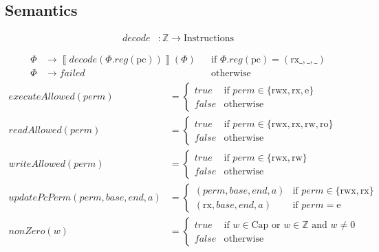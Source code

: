 \documentclass{article}
\newcommand{\sem}[1]{\left\llbracket #1 \right\rrbracket}
\newcommand{\false}{\mathit{false}}
\newcommand{\true}{\mathit{true}}
\newcommand{\var}[1]{\mathit{#1}}
\newcommand{\pcreg}{\mathrm{pc}}
\newcommand{\addr}{\var{a}}
\newcommand{\start}{\var{base}}
\newcommand{\addrend}{\var{end}}
\newcommand{\reg}{\var{reg}}
\newcommand{\perm}{\var{perm}}
\newcommand{\failed}{\mathit{failed}}
\newcommand{\plainfun}[1]{\mathit{#1}}
\newcommand{\decode}{\plainfun{decode}}
\newcommand{\updatePcPerm}[1]{\plainfun{updatePcPerm}(#1)}
\newcommand{\executeAllowed}[1]{\plainfun{executeAllowed}(#1)}
\newcommand{\nonZero}[1]{\plainfun{nonZero}(#1)}
\newcommand{\readAllowed}[1]{\plainfun{readAllowed}(#1)}
\newcommand{\writeAllowed}[1]{\plainfun{writeAllowed}(#1)}
\newcommand{\plaindom}[1]{\mathrm{#1}}
\newcommand{\Caps}{\plaindom{Cap}}
\newcommand{\Instrs}{\plaindom{Instructions}}
\newcommand{\ints}{\mathbb{Z}}
\newcommand{\plainperm}[1]{\mathrm{#1}}
\newcommand{\readonly}{\plainperm{ro}}
\newcommand{\readwrite}{\plainperm{rw}}
\newcommand{\exec}{\plainperm{rx}}
\newcommand{\entry}{\plainperm{e}}
\newcommand{\rwx}{\plainperm{rwx}}
\begin{document}
\subsection*{Semantics}
\begin{align*}
\decode &:\ints \rightarrow \Instrs
\end{align*}

\begin{align*}
\Phi & \rightarrow \sem{\decode(\Phi.\reg(\pcreg))}(\Phi) & & \text{if $\Phi.\reg(\pcreg) = (\exec{\_},{\_},{\_})$} \\
\Phi & \rightarrow \failed                                      & & \text{otherwise}
\end{align*}
\begin{align*}
  \executeAllowed{\perm} &=
                           \begin{cases}
                             \true & \text{if } \perm \in \{ \rwx, \exec, \entry \} \\
                             \false & \text{otherwise}
                           \end{cases} \\
  \readAllowed{\perm} &=
                           \begin{cases}
                             \true & \text{if } \perm \in \{ \rwx, \exec, \readwrite, \readonly \} \\
                             \false & \text{otherwise}
                           \end{cases} \\
  \writeAllowed{\perm} &=
                           \begin{cases}
                             \true & \text{if } \perm \in \{ \rwx, \readwrite\} \\
                             \false & \text{otherwise}
                           \end{cases} \\
  \updatePcPerm{\perm,\start,\addrend,\addr} &=
                                     \begin{cases}
                                       (\perm,\start,\addrend,\addr) & \text{if $\perm\in\{ \rwx, \exec \}$} \\
                                       (\exec,\start,\addrend,\addr) & \text{if $\perm = \entry$}
                                     \end{cases} \\
  \nonZero{w} &=
                \begin{cases}
                  \true & \text{if $w\in \Caps$ or $w\in \ints$ and $w \neq 0$}\\
                  \false & \text{otherwise}
                \end{cases}
\end{align*}
\end{document}
